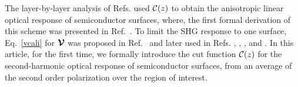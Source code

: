 \documentclass[floatfix,prb,aps,superscriptaddress,11pt,preprint,letterpaper]{revtex4}
\begin{document}
The layer-by-layer analysis of Refs.   
used ${\mathbf{\cal C}}(z)$
to obtain the  
anisotropic linear optical response of semiconductor surfaces, 
where, the first formal derivation  
of this scheme  
was presented in  
Ref.~. 
To limit the SHG response to one surface, Eq.~\eqref{vcali} 
for $\boldsymbol{\mathcal{\cal V}}$ was proposed in 
Ref.~ and later used in Refs.
,
,
,
 and . 
In this article, for the first time, we formally introduce the cut function ${\mathbf{\cal C}}(z)$ 
for the second-harmonic optical response of semiconductor surfaces,
from an average of the second order polarization over the region of interest.
\end{document}
